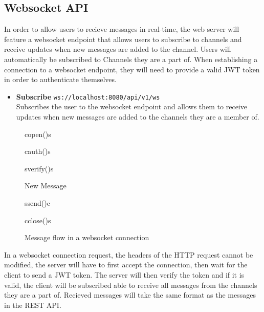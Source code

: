 \documentclass[a4paper,12pt]{article}
\begin{document}
	\newpage
	\subsection{Websocket API}
	\label{subsec:websocket_api}
	In order to allow users to recieve messages in real-time, the web server will feature a websocket endpoint that 
	allows users to subscribe to channels and receive updates when new messages are added to the channel. Users will
	automatically be subscribed to Channels they are a part of. When establishing a connection to a websocket endpoint,
	they will need to provide a valid JWT token in order to authenticate themselves.
	\begin{itemize}
		\item \textbf{Subscribe} \- \texttt{ws://localhost:8080/api/v1/ws} \\
		Subscribes the user to the websocket endpoint and allows them to receive updates when new messages are added
		to the channels they are a member of.
	\end{itemize}

	\begin{figure}
		\begin{center}
			\begin{sequencediagram}
				\renewcommand\unitfactor{0.6}
				\begin{call}{c}{open()}{s}{}
					\begin{call}{c}{auth()}{s}{}
						\begin{call}{s}{verify()}{s}{}
						\end{call}
					\end{call}
					\begin{sdblock}{New Message}{}
						\begin{messcall}{s}{send()}{c}
						\end{messcall}
					\end{sdblock}
					\begin{messcall}{c}{close()}{s}{}
					\end{messcall}
				\end{call}
			\end{sequencediagram}
		\end{center}
		\caption[Message flow in a websocket connection]{Message flow in a websocket connection}
	\end{figure}
	
	In a websocket connection request, the headers of the HTTP request cannot be modified, the server will have to first 
	accept the connection, then wait for the client to send a JWT token. The server will then verify the token and if it is 
	valid, the client will be subscribed able to receive all messages from the channels they are a part of. Recieved 
	messages will take the same format as the messages in the REST API.
	\clearpage
\end{document}
